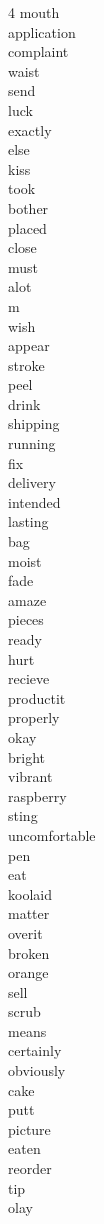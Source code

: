 \begin{multicols}{4}
	mouth\\ application\\ complaint\\ waist\\ send\\ luck\\ exactly\\ else\\ kiss\\
	took\\ bother\\ placed\\ close\\ must\\ alot\\ m\\ wish\\ appear\\ stroke\\
	peel\\ drink\\ shipping\\ running\\ fix\\ delivery\\ intended\\ lasting\\ bag\\
	moist\\ fade\\ amaze\\ pieces\\ ready\\ hurt\\ recieve\\ productit\\ properly\\
	okay\\ bright\\ vibrant\\ raspberry\\ sting\\ uncomfortable\\ pen\\ eat\\
	koolaid\\ matter\\ overit\\ broken\\ orange\\ sell\\ scrub\\ means\\ certainly\\
	obviously\\ cake\\ putt\\ picture\\ eaten\\ reorder\\ tip\\ olay\\


\end{multicols}
